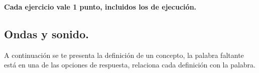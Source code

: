 \documentclass[12pt, letter]{exam}
\begin{document}
% 

\begin{center}
\textbf{Cada ejercicio vale 1 punto, incluidos los de ejecución.}
\end{center}

\begin{questions}

    \section{Ondas y sonido.}
    
    \vbox{\leftskip\leftmargin A continuación se te presenta la definición de un concepto, la palabra faltante está en una de las opciones de respuesta, relaciona cada definición con la palabra.}


\end{questions}
\end{document}
